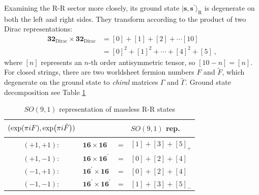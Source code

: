 	Examining the R-R sector more closely, its ground state $\lvert\mathbf{s},\mathbf{s}^{\prime}\rangle_{\text{R}}$ is degenerate on both the left and right sides. They transform according to the product of two Dirac representations:
	\begin{align}
		\mathbf{32}_{\text{Dirac}}\times \mathbf{32}_{\text{Dirac}}
		&=[0]+[1]+[2]+\cdots[10] \nonumber \\
		&=[0]^{2}+[1]^{2}+\cdots +[4]^{2}+[5] \:, \label{10.2.25}
	\end{align}
	where $[n]$ represents an $n$-th order antisymmetric tensor, so $[10-n]=[n]$. For closed strings, there are two worldsheet fermion numbers $F$ and $\tilde{F}$, which degenerate on the ground state to \emph{chiral} matrices $\Gamma$ and $\tilde{\Gamma}$. Ground state decomposition see Table \ref{tab:10.1}
	\begin{table}[h]
		\caption{$SO(9,1)$ representation of massless R-R states}
		\label{tab:10.1}%
		\centering
		\begin{tabular}[c]{clcl}
			\hline\hline
			$\vphantom{\Big[}(\exp(\pi i F),\exp(\pi i\tilde{F}))$ & & &$SO(9,1)$ rep.  \\
			\hline
			$(+1,+1):$& $ \mathbf{16}\times\mathbf{16} $ & = &  $[1]+[3]+[5]_{+}$\\
			$(+1,-1):$& $ \mathbf{16}\times\mathbf{16}^{\prime}$ & = &  $[0]+[2]+[4]$\\
			$(-1,+1):$& $ \mathbf{16}^{\prime}\times\mathbf{16} $ & = &  $[0]+[2]+[4]$\\
			$(-1,-1):$& $ \mathbf{16}^{\prime}\times\mathbf{16}^{\prime} $ & = &  $[1]+[3]+[5]_{-}$ \\
			\hline\hline
		\end{tabular}
	\end{table}
